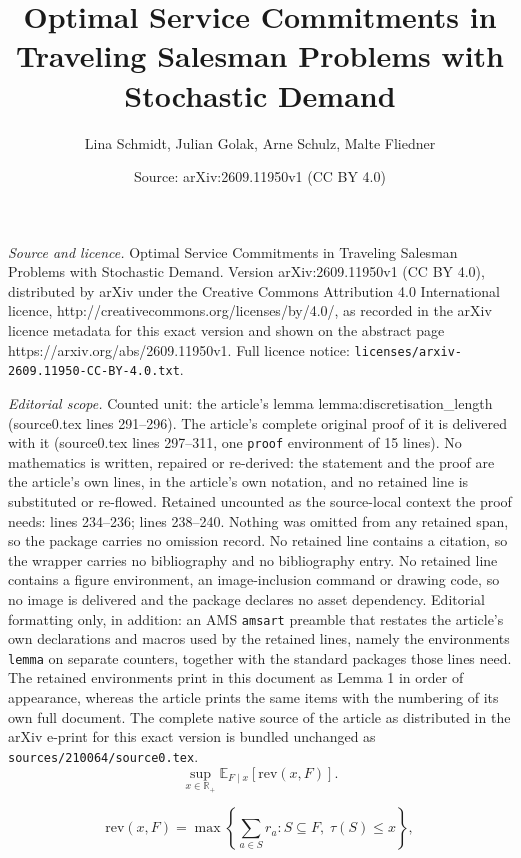 \documentclass[10pt,a4paper]{amsart}
\title{Optimal Service Commitments in Traveling Salesman Problems with Stochastic Demand}
\author{Lina Schmidt, Julian Golak, Arne Schulz, Malte Fliedner}
\date{Source: arXiv:2609.11950v1 (CC BY 4.0)}
\begin{document}
\maketitle

\noindent\emph{Source and licence.} Optimal Service Commitments in Traveling Salesman Problems with Stochastic Demand. Version arXiv:2609.11950v1 (CC BY 4.0), distributed by arXiv under the Creative Commons Attribution 4.0 International licence, http://creativecommons.org/licenses/by/4.0/, as recorded in the arXiv licence metadata for this exact version and shown on the abstract page https://arxiv.org/abs/2609.11950v1. Full licence notice: \texttt{licenses/arxiv-2609.11950-CC-BY-4.0.txt}.\par\smallskip

\noindent\textit{Editorial scope.} Counted unit: the article's lemma lemma:discretisation\_length (source0.tex lines 291--296). The article's complete original proof of it is delivered with it (source0.tex lines 297--311, one \texttt{proof} environment of 15 lines). No mathematics is written, repaired or re-derived: the statement and the proof are the article's own lines, in the article's own notation, and no retained line is substituted or re-flowed.  Retained uncounted as the source-local context the proof needs: lines 234--236; lines 238--240.  Nothing was omitted from any retained span, so the package carries no omission record.  No retained line contains a citation, so the wrapper carries no bibliography and no bibliography entry.  No retained line contains a figure environment, an image-inclusion command or drawing code, so no image is delivered and the package declares no asset dependency.  Editorial formatting only, in addition: an AMS \texttt{amsart} preamble that restates the article's own declarations and macros used by the retained lines, namely the environments \texttt{lemma} on separate counters, together with the standard packages those lines need.  The retained environments print in this document as Lemma 1 in order of appearance, whereas the article prints the same items with the numbering of its own full document.  The complete native source of the article as distributed in the arXiv e-print for this exact version is bundled unchanged as \texttt{sources/210064/source0.tex}.
	\begin{equation}\label{eq:1stageOpt}
		\sup_{x \in \mathbb{R}_+} \mathbb{E}_{F\mid x}\left[ \text{rev}(x, F)\right].
	\end{equation}

	\begin{equation}\label{eq:2stageOpt}
		\text{rev}(x, F) = \max \left\{ \sum_{a \in S} r_a \colon S \subseteq F,\; \tau(S) \leq x \right\},
	\end{equation}
\end{document}
